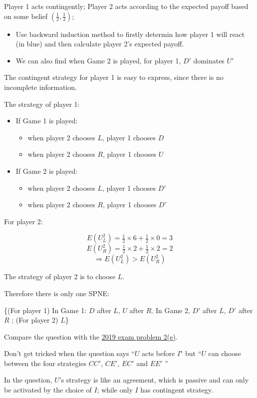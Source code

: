 \documentclass{article}
\begin{document}
\begin{mdframed}[backgroundcolor=blue!20,linecolor=white]
Player 1 acts contingently; Player 2 acts according to the expected payoff based on some belief $(\tfrac12,\tfrac12)$; 
\begin{itemize}
\item Use backward induction method to firstly determin how player 1 will react (in blue) and then calculate player 2's expected payoff.
\item We can also find when Game 2 is played, for player 1, $D'$ dominates $U'$
\end{itemize}

The contingent strategy for player 1 is easy to express, since there is no incomplete information.

\end{mdframed}

The strategy of player 1:
\begin{itemize}
\item If Game 1 is played:
\begin{itemize}
\item when player 2 chooses $L$, player 1 chooses $D$
\item when player 2 chooses $R$, player 1 chooses $U$
\end{itemize}
\item If Game 2 is played:
\begin{itemize}
\item when player 2 chooses $L$, player 1 chooses $D'$
\item when player 2 chooses $R$, player 1 chooses $D'$
\end{itemize}
\end{itemize}

For player 2:


$$E(U^2_L) = \tfrac12 \times 6 +\tfrac12 \times 0 = 3$$
$$E(U^2_R) = \tfrac12 \times 2 +\tfrac12 \times 2 = 2$$
$$\Rightarrow E(U^2_L) > E(U^2_R)$$

The strategy of player 2 is to choose $L$.

\medskip

Therefore there is only one SPNE:

\{(For player 1) In Game 1: $D$ after $L$, $U$ after $R$. In Game 2, $D'$ after $L$, $D'$ after $R$ ; (For player 2) $L$\}

\begin{mdframed}[backgroundcolor=blue!20,linecolor=white]
Compare the question with the \href{https://www.uio.no/studier/emner/sv/oekonomi/ECON4220/previous-exams/econ32_4220_2019h_sensorveiledning.pdf}{2019 exam problem 2(e)}. 

\medskip

Don't get tricked when the question says ``$U$ acts before $I$" but ``$U$ can choose between the four strategies $CC'$, $CE'$, 
$EC'$ and $EE'$ ''

\medskip

In the question, $U$'s strategy is like an agreement, which is passive and can only be activated by the choice of $I$; while only $I$ has contingent strategy.

\end{mdframed}
\end{document}
